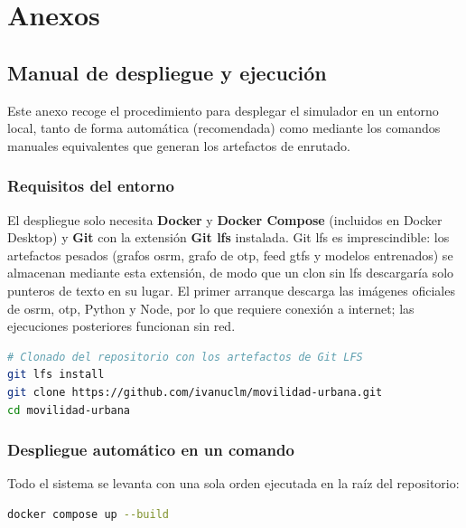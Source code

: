 \chapter{Anexos}

\section{Manual de despliegue y ejecución}
\label{anx:despliegue}

Este anexo recoge el procedimiento para desplegar el simulador en un entorno local, tanto de forma automática (recomendada) como mediante los comandos manuales equivalentes que generan los artefactos de enrutado.

\subsection{Requisitos del entorno}

El despliegue solo necesita \textbf{Docker} y \textbf{Docker Compose} (incluidos en Docker Desktop) y \textbf{Git} con la extensión \textbf{Git \gls{lfs}} instalada. Git \gls{lfs} es imprescindible: los artefactos pesados (grafos \gls{osrm}, grafo de \gls{otp}, feed \gls{gtfs} y modelos entrenados) se almacenan mediante esta extensión, de modo que un clon sin \gls{lfs} descargaría solo punteros de texto en su lugar. El primer arranque descarga las imágenes oficiales de \gls{osrm}, \acrlong{otp}, Python y Node, por lo que requiere conexión a internet; las ejecuciones posteriores funcionan sin red.

\begin{lstlisting}[language=bash]
# Clonado del repositorio con los artefactos de Git LFS
git lfs install
git clone https://github.com/ivanuclm/movilidad-urbana.git
cd movilidad-urbana
\end{lstlisting}

\subsection{Despliegue automático en un comando}

Todo el sistema se levanta con una sola orden ejecutada en la raíz del repositorio:

\begin{lstlisting}[language=bash]
docker compose up --build
\end{lstlisting}

